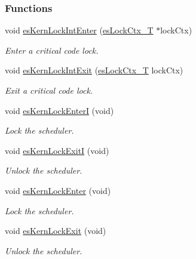 \subsubsection*{Functions}
\begin{DoxyCompactItemize}
\item 
void \hyperlink{group__kern__lock_gaa3ca4a02fafcfb840442506f42175a13}{es\-Kern\-Lock\-Int\-Enter} (\hyperlink{group__kern__lock_gad8b2b8257c3bf42c064adb66c0d45e2e}{es\-Lock\-Ctx\-\_\-\-T} $\ast$lock\-Ctx)
\begin{DoxyCompactList}\small\item\em Enter a critical code lock. \end{DoxyCompactList}\item 
void \hyperlink{group__kern__lock_gad8cb192a48802804cc12162edd18668d}{es\-Kern\-Lock\-Int\-Exit} (\hyperlink{group__kern__lock_gad8b2b8257c3bf42c064adb66c0d45e2e}{es\-Lock\-Ctx\-\_\-\-T} lock\-Ctx)
\begin{DoxyCompactList}\small\item\em Exit a critical code lock. \end{DoxyCompactList}\item 
void \hyperlink{group__kern__lock_ga6dd45355c20a10f7272bd39670353428}{es\-Kern\-Lock\-Enter\-I} (void)
\begin{DoxyCompactList}\small\item\em Lock the scheduler. \end{DoxyCompactList}\item 
void \hyperlink{group__kern__lock_ga3287aefb2c7dd24672c716d86a008ad3}{es\-Kern\-Lock\-Exit\-I} (void)
\begin{DoxyCompactList}\small\item\em Unlock the scheduler. \end{DoxyCompactList}\item 
void \hyperlink{group__kern__lock_ga86ec4f4cbaa889b0f23c7e2ebdcbbb97}{es\-Kern\-Lock\-Enter} (void)
\begin{DoxyCompactList}\small\item\em Lock the scheduler. \end{DoxyCompactList}\item 
void \hyperlink{group__kern__lock_gaf1eec663f7cc5c414b113901382ccd82}{es\-Kern\-Lock\-Exit} (void)
\begin{DoxyCompactList}\small\item\em Unlock the scheduler. \end{DoxyCompactList}\end{DoxyCompactItemize}


